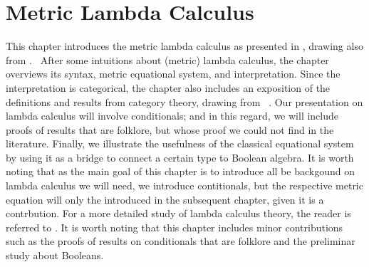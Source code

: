 


  


   



















\chapter{Metric Lambda Calculus} \label{ch:metriclambda}




This chapter introduces the metric lambda calculus as presented in \cite{dahlqvist2023syntactic}, drawing also from \cite{mackieLanguageAutonomous1993,croleCategoriesTypes1994,selinger2013lecture}.  After some intuitions about (metric) lambda calculus, the chapter overviews its syntax, metric equational system, and interpretation. Since the interpretation is categorical, the chapter also includes an exposition of the definitions and results from category theory, drawing from  \cite{yanofskyMonoidalCategoryTheory2024,barrCategoryTheoryComputing1990,maclane13}. Our presentation on lambda calculus will involve conditionals; and in this regard, we will include proofs of results that are folklore, but whose proof we could not find in the literature. Finally, we illustrate the usefulness of the classical equational system by using it as a bridge to connect a certain type to Boolean algebra. It is worth noting that as the main goal of this chapter is to introduce all be backgound on lambda calculus we will need, we introduce contitionals, but the respective metric equation will only the introduced in the subsequent chapter, given it is a contrbution. 
For a more detailed study of lambda calculus theory, the reader is referred to \eg \cite{barendregt1984lambda}. It is worth noting that this chapter includes minor contributions such as the proofs of results on conditionals that are folklore and the preliminar study about Booleans.


